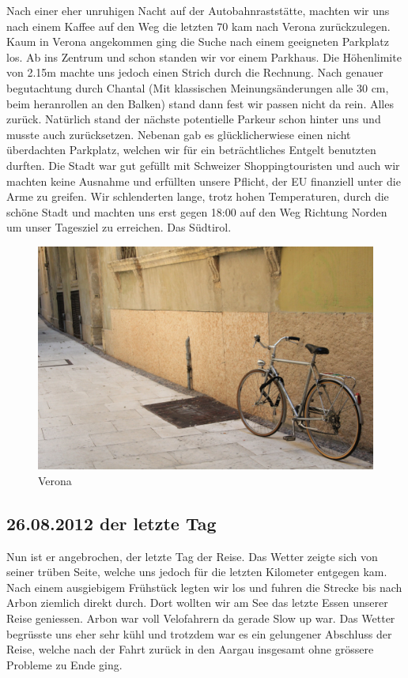 Nach einer eher unruhigen Nacht auf der Autobahnraststätte, machten wir uns nach einem Kaffee auf den Weg die letzten 70 kam nach Verona zurückzulegen.
Kaum in Verona angekommen ging die Suche nach einem geeigneten Parkplatz los.
Ab ins Zentrum und schon standen wir vor einem Parkhaus.
Die Höhenlimite von 2.15m machte uns jedoch einen Strich durch die Rechnung.
Nach genauer begutachtung durch Chantal (Mit klassischen Meinungsänderungen alle 30 cm, beim heranrollen an den Balken) stand dann fest wir passen nicht da rein.
Alles zurück.
Natürlich stand der nächste potentielle Parkeur schon hinter uns und musste auch zurücksetzen.
Nebenan gab es glücklicherwiese einen nicht überdachten Parkplatz, welchen wir für ein beträchtliches Entgelt benutzten durften.
Die Stadt war gut gefüllt mit Schweizer Shoppingtouristen und auch wir machten keine Ausnahme und erfüllten unsere Pflicht, der EU finanziell unter die Arme zu greifen.
Wir schlenderten lange, trotz hohen Temperaturen, durch die schöne Stadt und machten uns erst gegen 18:00 auf den Weg Richtung Norden um unser Tagesziel zu erreichen.
Das Südtirol. 

\begin{figure}[H]
    \centering
    \includegraphics[width=\textwidth]{../Bilder/Sommer2012/103.jpg}
    \caption{Verona}
    \label{img:Sommer11}
\end{figure}

\subsection{26.08.2012 der letzte Tag}

Nun ist er angebrochen, der letzte Tag der Reise.
Das Wetter zeigte sich von seiner trüben Seite, welche uns jedoch für die letzten Kilometer entgegen kam.
Nach einem ausgiebigem Frühstück legten wir los und fuhren die Strecke bis nach Arbon ziemlich direkt durch.
Dort wollten wir am See das letzte Essen unserer Reise geniessen.
Arbon war voll Velofahrern da gerade Slow up war.
Das Wetter begrüsste uns eher sehr kühl und trotzdem war es ein gelungener Abschluss der Reise, welche nach der Fahrt zurück in den Aargau insgesamt ohne grössere Probleme zu Ende ging.

